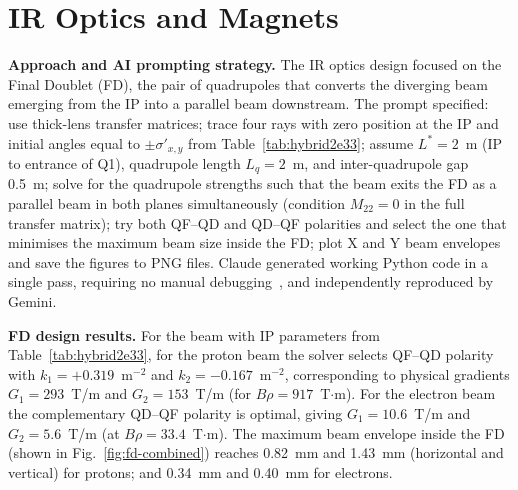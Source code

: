 \documentclass[%
               refpage       %
               hyphens,      %
               ]{jacow}
\begin{document}
\section{IR Optics and Magnets}                                                
   
  \textbf{Approach and AI prompting strategy.}                                   
  The IR optics design focused on the Final Doublet (FD), the pair of
  quadrupoles that converts the diverging beam emerging from the IP into         
  a parallel beam downstream.                               
  The prompt specified: use thick-lens transfer matrices; trace four rays        
  with zero position at the IP and initial angles equal to  
  $\pm\sigma'_{x,y}$ from Table~\ref{tab:hybrid2e33}; assume                     
  $L^{*}=2$~m (IP to entrance of Q1), quadrupole length $L_q=2$~m, and           
  inter-quadrupole gap 0.5~m; solve for the quadrupole strengths such that       
  the beam exits the FD as a parallel beam in both planes simultaneously         
  (condition $M_{22}=0$ in the full transfer matrix); try both QF--QD and
  QD--QF polarities and select the one that minimises the maximum beam           
  size inside the FD; plot X and Y beam envelopes and save the figures to
  PNG files.                                                                     
  Claude generated working Python code in a single pass, requiring no
  manual debugging~\cite{GitHub}, and independently reproduced by Gemini.                                                
                                                                                 
  \textbf{FD design results.}
For the beam with IP parameters from 
Table~\ref{tab:hybrid2e33}, for the proton beam  
the solver selects QF--QD polarity with           
  $k_1=+0.319$~m$^{-2}$ and $k_2=-0.167$~m$^{-2}$, corresponding to              
  physical gradients $G_1=293$~T/m and $G_2=153$~T/m (for $B\rho=917$~T$\cdot$m). 
For the electron beam the complementary QD--QF polarity is
  optimal, giving $G_1=10.6$~T/m and $G_2=5.6$~T/m (at $B\rho=33.4$~T$\cdot$m). 
  The maximum beam envelope inside the FD (shown in      
  Fig.~\ref{fig:fd-combined}) reaches 0.82~mm and 1.43~mm (horizontal and vertical) for protons; and 0.34~mm and 0.40~mm for electrons.            
  
\end{document}

